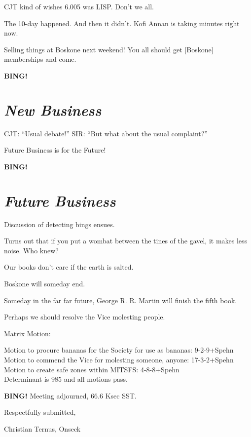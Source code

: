 \documentclass[10pt]{article}
\newcommand{\bing}{{\bf BING!} }
\newcommand{\goto}[1]{\bing \vskip 12pt \section*{{\em{#1}}}}
\begin{document}
CJT kind of wishes 6.005 was LISP.  Don't we all.

The 10-day happened.  And then it didn't.  Kofi Annan is taking
minutes right now.

Selling things at Boskone next weekend!  You all should get [Boskone]
memberships and come.

\goto{New Business}

CJT: ``Usual debate!'' SIR: ``But what about the usual complaint?''

Future Business is for the Future!

\goto{Future Business}

Discussion of detecting bings ensues.

Turns out that if you put a wombat between the tines of the gavel, it
makes less noise.  Who knew?

Our books don't care if the earth is salted.

Boskone will someday end.

Someday in the far far future, George R. R. Martin will finish the
fifth book.

Perhaps we should resolve the Vice molesting people.

Matrix Motion:

Motion to procure bananas for the Society for use as bananas: 9-2-9+Spehn\\
Motion to commend the Vice for molesting someone, anyone: 17-3-2+Spehn\\
Motion to create safe zones within MITSFS: 4-8-8+Spehn\\

Determinant is 985 and all motions pass.

\bing
\noindent
Meeting adjourned, 66.6 Ksec SST.

\vspace{18pt}

\centerline{Respectfully submitted,}
\centerline{Christian Ternus, Onseck}
\end{document}
